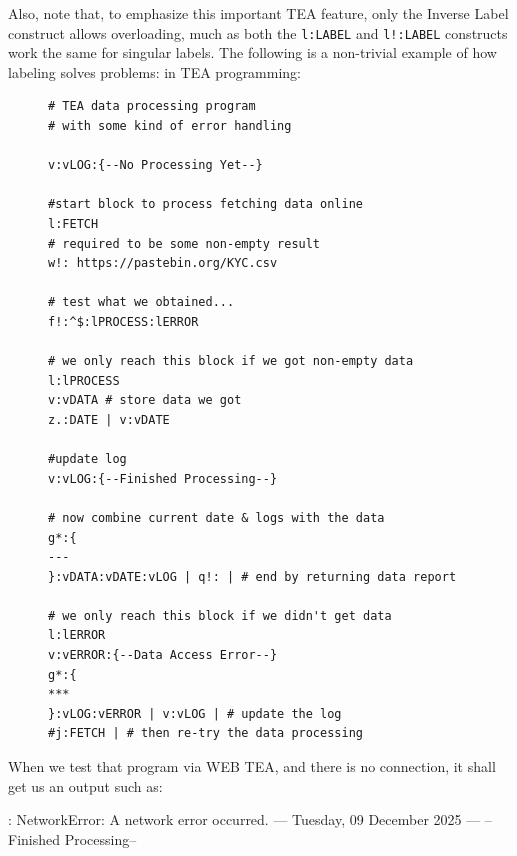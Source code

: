 \documentclass[a4paper, 18pt]{book} %
\begin{document}
Also, note that, to emphasize this important TEA feature, only the Inverse Label construct allows overloading, much as both the \texttt{l:LABEL} and \texttt{l!:LABEL} constructs work the same for singular labels. The following is a non-trivial example of how labeling solves problems: in TEA programming:



\vspace{2em}


\begin{figure}[H]
 \Large
  \centering
  \begin{tcolorbox}[teaterminalstyle, title=L: EXAMPLE 1]
  \begin{lstlisting}[language=TEA]
# TEA data processing program
# with some kind of error handling

v:vLOG:{--No Processing Yet--} 

#start block to process fetching data online
l:FETCH
# required to be some non-empty result
w!: https://pastebin.org/KYC.csv 

# test what we obtained...
f!:^$:lPROCESS:lERROR 

# we only reach this block if we got non-empty data
l:lPROCESS
v:vDATA # store data we got
z.:DATE | v:vDATE

#update log
v:vLOG:{--Finished Processing--} 

# now combine current date & logs with the data
g*:{
---
}:vDATA:vDATE:vLOG | q!: | # end by returning data report

# we only reach this block if we didn't get data
l:lERROR 
v:vERROR:{--Data Access Error--}
g*:{
***
}:vLOG:vERROR | v:vLOG | # update the log
#j:FETCH | # then re-try the data processing
   \end{lstlisting}
  \end{tcolorbox}
\end{figure}


\vspace{2em}



When we test that program via WEB TEA, and there is no connection, it shall get us an output such as:


  \begin{tcbverbatim}[title=Example 1: Sample Output ]
[ERROR]: NetworkError: A network error occurred.
---
Tuesday, 09 December 2025
---
--Finished Processing--
  \end{tcbverbatim}


\vspace{2em}
\end{document}
